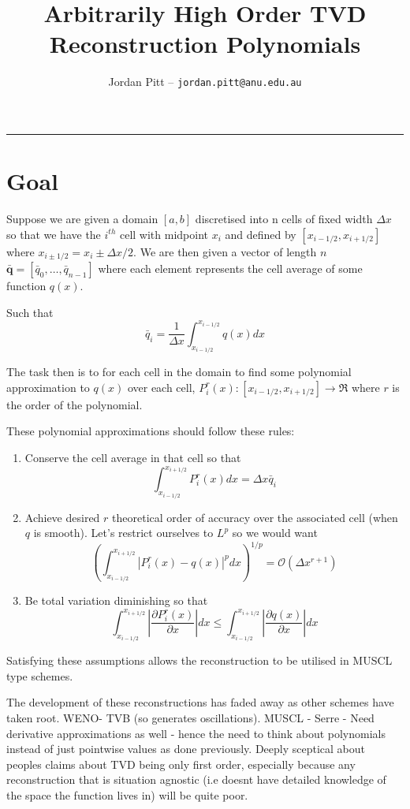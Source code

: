 \documentclass[10pt]{article}
\title{Arbitrarily High Order TVD Reconstruction Polynomials}
\author{Jordan Pitt -- \texttt{jordan.pitt@anu.edu.au}}
\newcommand{\vecn}[1]{\boldsymbol{#1}}
\begin{document}
\maketitle

\vspace{-0.3in}
\noindent
\rule{\linewidth}{0.4pt}

\section{Goal}
Suppose we are given a domain $\left[a,b\right]$ discretised into n cells of fixed width $\Delta x$ so that we have the $i^{th}$ cell with midpoint $x_i$ and defined by $\left[x_{i-1/2}, x_{i+1/2}\right]$ where $x_{i\pm 1/2} = x_i \pm \Delta x/ 2$. We are then given a vector of length $n$ $\vecn{\bar{q}} = \left[\bar{q}_0, \dots, \bar{q}_{n-1}\right]$ where each element represents the cell average of some function $q(x)$.

Such that
\[\bar{q}_i = \frac{1}{\Delta x}\int_{x_{i-1/2}}^{x_{i-1/2}} q(x) dx\]

The task then is to for each cell in the domain to find some polynomial approximation to $q(x)$ over each cell, $P^r_i(x) : \left[x_{i-1/2}, x_{i+1/2}\right] \rightarrow \Re $ where $r$ is the order of the polynomial. 

These polynomial approximations should follow these rules:
\begin{enumerate}
	\item Conserve the cell average in that cell so that
		\[\int_{x_{i-1/2}}^{x_{i+1/2}} P^r_i(x) dx   = \Delta x \bar{q}_i \]
	\item Achieve desired $r$ theoretical order of accuracy over the associated cell (when $q$ is smooth). Let's restrict ourselves to $L^p$ so we would want
	\[\left(\int_{x_{i-1/2}}^{x_{i+1/2}} \left|P^r_i(x) - q(x) \right|^p dx \right)^{1/p}  = \mathcal{O}\left(\Delta x^{r+1}\right) \]
	\item Be total variation diminishing so that
	\[\int_{x_{i-1/2}}^{x_{i+1/2}}  \left|\frac{\partial P^r_i(x)}{\partial x}\right| dx \le \int_{x_{i-1/2}}^{x_{i+1/2}}  \left|\frac{\partial q(x)}{\partial x}\right| dx \]
\end{enumerate}

Satisfying these assumptions allows the reconstruction to be utilised in MUSCL type schemes. 

The development of these reconstructions has faded away as other schemes have taken root. WENO- TVB (so generates oscillations). MUSCL - Serre - Need derivative approximations as well - hence the need to think about polynomials instead of just pointwise values as done previously. Deeply sceptical about peoples claims about TVD being only first order, especially because any reconstruction that is situation agnostic (i.e doesnt have detailed knowledge of the space the function lives in) will be quite poor.
\end{document}

